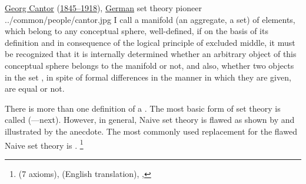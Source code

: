 \qboxnpq
  {
    \href{http://en.wikipedia.org/wiki/Georg_Cantor}{Georg Cantor} 
    (\href{http://www-history.mcs.st-andrews.ac.uk/Timelines/TimelineF.html}{1845--1918}), 
    \href{http://www-history.mcs.st-andrews.ac.uk/BirthplaceMaps/Places/Germany.html}{German}
    set theory pioneer
    \footnotemark
  }
  {../common/people/cantor.jpg}
  {I call a manifold (an aggregate, a set) of elements,
    which belong to any conceptual sphere, well-defined, if on the
    basis of its definition and in consequence of the logical principle
    of excluded middle, it must be recognized that it is internally
    determined whether an arbitrary object of this conceptual sphere
    belongs to the manifold or not, and also, whether two objects in
    the set , in spite of formal differences in the manner in which they
    are given, are equal or not.}

There is more than one definition of a .
The most basic form of set theory is called  (---next).
However, in general, Naive set theory is flawed as shown by
 and illustrated by the  anecdote.
The most commonly used replacement for the flawed Naive set theory
is .%
\footnote{
   (7 axioms),
   (English translation),
  ,
  }

